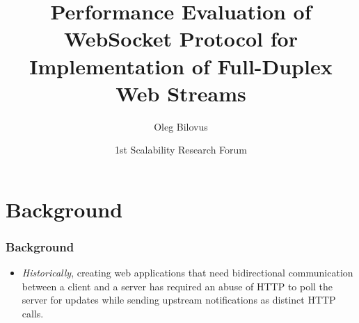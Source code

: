 \documentclass{beamer}
\title[WebSocket]{Performance Evaluation of WebSocket Protocol for Implementation of Full-Duplex Web Streams}
\author{Oleg Bilovus}
\institute{Università degli Studi di Salerno}
\date[SRF 1st]{1st Scalability Research Forum}
\begin{document}
\begin{frame}
    \titlepage{}
\end{frame}


\section{Background}
\begin{frame}
    \frametitle{Background}
    \begin{itemize}[<+->]
        \item \emph{Historically}, creating \alert<+->{web applications} that need \alert<+->{bidirectional
                  communication} between a \alert<+->{client} and a \alert<+->{server} has required an \alert<+->{abuse of
                  HTTP to poll} the server for updates while sending upstream notifications as
              \alert<+->{distinct HTTP calls}.
    \end{itemize}
\end{frame}
\end{document}
